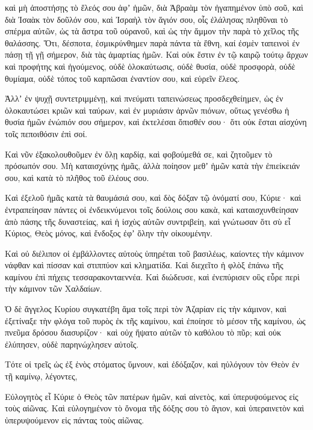{καὶ μὴ ἀποστήσῃς τὸ ἔλεός σου ἀφʼ ἡμῶν, διὰ Ἁβραὰμ τὸν ἠγαπημένον ὑπὸ σοῦ, καὶ διὰ Ἰσαὰκ τὸν δοῦλόν σου, καὶ Ἰσραὴλ τὸν ἅγιόν σου,
οἷς ἐλάλησας πληθῦναι τὸ σπέρμα αὐτῶν, ὡς τὰ ἄστρα τοῦ οὐρανοῦ, καὶ ὡς τὴν ἄμμον τὴν παρὰ τὸ χεῖλος τῆς θαλάσσης.
Ὅτι, δέσποτα, ἐσμικρύνθημεν παρὰ πάντα τὰ ἔθνη, καί ἐσμὲν ταπεινοὶ ἐν πάσῃ τῇ γῇ σήμερον, διὰ τὰς ἁμαρτίας ἡμῶν.
Καὶ οὐκ ἔστιν ἐν τῷ καιρῷ τούτῳ ἄρχων καὶ προφήτης καὶ ἡγούμενος, οὐδὲ ὁλοκαύτωσις, οὐδὲ θυσία, οὐδὲ προσφορὰ, οὐδὲ θυμίαμα, οὐδὲ τόπος τοῦ καρπῶσαι ἐναντίον σου, καὶ εὑρεῖν ἕλεος.
\par }{\PP {}Ἀλλʼ ἐν ψυχῇ συντετριμμένῃ, καὶ πνεύματι ταπεινώσεως προσδεχθείημεν, ὡς ἐν ὁλοκαυτώσει κριῶν καὶ ταύρων, καὶ ἐν μυριάσιν ἀρνῶν πιόνων,
οὕτως γενέσθω ἡ θυσία ἡμῶν ἐνώπιόν σου σήμερον, καὶ ἐκτελέσαι ὄπισθέν σου· ὅτι οὐκ ἔσται αἰσχύνη τοῖς πεποιθόσιν ἐπὶ σοί.
\par }{\PP {}Καὶ νῦν ἐξακολουθοῦμεν ἐν ὅλῃ καρδίᾳ, καὶ φοβούμεθά σε, καὶ ζητοῦμεν τὸ πρόσωπόν σου. Μὴ καταισχύνῃς ἡμᾶς,
ἀλλὰ ποίησον μεθʼ ἡμῶν κατὰ τὴν ἐπιείκειάν σου, καὶ κατὰ τὸ πλῆθος τοῦ ἐλέους σου.
\par }{\PP {}Καὶ ἐξελοῦ ἡμᾶς κατὰ τὰ θαυμάσιά σου, καὶ δὸς δόξαν τῷ ὀνόματί σου, Κύριε·
καὶ ἐντραπείησαν πάντες οἱ ἐνδεικνύμενοι τοῖς δούλοις σου κακὰ, καὶ καταισχυνθείησαν ἀπὸ πάσης τῆς δυναστείας, καὶ ἡ ἰσχὺς αὐτῶν συντριβείη,
καὶ γνώτωσαν ὅτι σὺ εἶ Κύριος, Θεὸς μόνος, καὶ ἔνδοξος ἐφʼ ὅλην τὴν οἰκουμένην.
\par }{\PP {}Καὶ οὐ διέλιπον οἱ ἐμβάλλοντες αὐτοὺς ὑπηρέται τοῦ βασιλέως, καίοντες τὴν κάμινον νάφθαν καὶ πίσσαν καὶ στιππύον καὶ κληματίδα.
Καὶ διεχεῖτο ἡ φλὸξ ἐπάνω τῆς καμίνου ἐπὶ πήχεις τεσσαρακονταεννέα.
Καὶ διώδευσε, καὶ ἐνεπύρισεν οὓς εὗρε περὶ τὴν κάμινον τῶν Χαλδαίων.
\par }{\PP {}Ὁ δὲ ἄγγελος Κυρίου συγκατέβη ἅμα τοῖς περὶ τὸν Ἀζαρίαν εἰς τὴν κάμινον, καὶ ἐξετίναξε τὴν φλόγα τοῦ πυρὸς ἐκ τῆς καμίνου,
καὶ ἐποίησε τὸ μέσον τῆς καμίνου, ὡς πνεῦμα δρόσου διασυρίζον· καὶ οὐχ ἥψατο αὐτῶν τὸ καθόλου τὸ πῦρ; καὶ οὐκ ἐλύπησεν, οὐδὲ παρηνώχλησεν αὐτοῖς.
\par }{\PP {}Τότε οἱ τρεῖς ὡς ἐξ ἑνὸς στόματος ὕμνουν, καὶ ἐδόξαζον, καὶ ηὐλόγουν τὸν Θεὸν ἐν τῇ καμίνῳ, λέγοντες,
\par }{\PP {}Εὐλογητὸς εἶ Κύριε ὁ Θεὸς τῶν πατέρων ἡμῶν, καὶ αἰνετὸς, καὶ ὑπερυψούμενος εἰς τοὺς αἰῶνας. Καὶ εὐλογημένον τὸ ὄνομα τῆς δόξης σου τὸ ἅγιον, καὶ ὑπεραινετὸν καὶ ὑπερυψούμενον εἰς πάντας τοὺς αἰῶνας.
}
